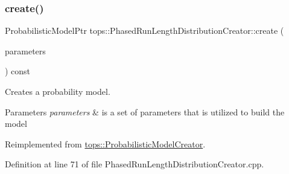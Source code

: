 \subsubsection{\texorpdfstring{create()}{create()}}
{\footnotesize\ttfamily Probabilistic\+Model\+Ptr tops\+::\+Phased\+Run\+Length\+Distribution\+Creator\+::create (\begin{DoxyParamCaption}\item[{\hyperlink{classtops_1_1ProbabilisticModelParameters}{Probabilistic\+Model\+Parameters} \&}]{parameters }\end{DoxyParamCaption}) const\hspace{0.3cm}{\ttfamily [virtual]}}



Creates a probability model. 


\begin{DoxyParams}{Parameters}
{\em parameters} & is a set of parameters that is utilized to build the model \\
\hline
\end{DoxyParams}


Reimplemented from \hyperlink{classtops_1_1ProbabilisticModelCreator_afed6c8ffa45fff446bdaa8b533da8f7c}{tops\+::\+Probabilistic\+Model\+Creator}.



Definition at line 71 of file Phased\+Run\+Length\+Distribution\+Creator.\+cpp.


